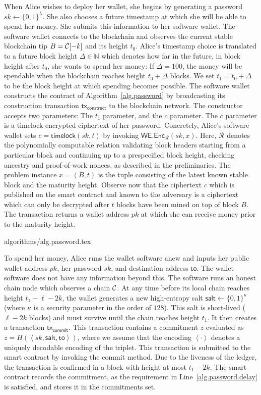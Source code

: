 When Alice wishes to deploy her wallet, she
begins by generating a password $sk \gets \{0, 1\}^\lambda$. She also chooses
a future timestamp at which she will be able to spend her money.
She submits this information to her
software wallet.
The software wallet connects to
the blockchain and observes the current stable blockchain tip $B = \mathcal{C}[-k]$
and its height $t_0$.
Alice's timestamp choice is translated to a future block height $\Delta \in \mathbb{N}$ which
denotes how far in the future,
in block height after $t_0$, she wants to spend her money: If $\Delta = 100$, the money will
be spendable when the blockchain reaches height $t_0 + \Delta$ blocks.
We set $t_1 = t_0 + \Delta$ to be the block height at which spending becomes possible.
The software wallet constructs the contract of Algorithm~\ref{alg.password}
by broadcasting its construction transaction $\textsf{tx}_\textsf{construct}$
to the blockchain network.
The constructor accepts two parameters: The $t_1$ parameter,
and the $c$ parameter. The $c$ parameter is a timelock-encrypted
ciphertext of her password. Concretely, Alice's software wallet
sets $c = \textsf{timelock}(sk, t)$ by invoking $\textsf{WE.Enc}_\mathcal{R}(sk, x)$.
Here, $\mathcal{R}$ denotes the polynomially computable relation validating block headers
starting from a particular block and continuing up to a prespecified block height, checking
ancestry and proof-of-work nonces, as described in the preliminaries. The problem instance $x = (B, t)$
is the tuple consisting of the latest known stable block and the maturity height.
Observe now that the ciphertext $c$ which is published on the
smart contract and known to the adversary is a ciphertext which can only be decrypted
after $t$ blocks have been mined on top of block $B$. The transaction returns a wallet address $pk$
at which she can receive money prior to the maturity height.

{algorithms/alg.password.tex}

To spend her money, Alice runs the wallet software anew and inputs her public wallet address $pk$,
her password $sk$, and destination address $\textsf{to}$. The wallet software does not have any information beyond this.
The software runs an honest chain node which observes a chain $\mathcal{C}$.
At any time before its local chain reaches height $t_1 - \ell - 2k$,
the wallet generates a new high-entropy salt $\textsf{salt} \gets \{0, 1\}^\kappa$ (where $\kappa$
is a security parameter in the order of $128$). This salt
is short-lived ($\ell - 2k$ blocks) and must survive until the chain reaches height $t_1$.
It then creates a transaction $\textsf{tx}_\textsf{commit}$.
This transaction contains
a commitment $z$ evaluated as $z = H(\left<sk, \textsf{salt}, \textsf{to}\right>)$,
where we assume that the encoding $\left<\cdot\right>$ denotes a uniquely decodable encoding
of the triplet.
This transaction is submitted to the smart contract by invoking the \textsf{commit} method.
Due to the liveness of the ledger, the transaction is confirmed in a block with
height at most $t_1 - 2k$. The smart contract records the commitment, as the requirement
in Line~\ref{alg.password.delay} is satisfied, and stores it in the \textsf{commitments} set.

